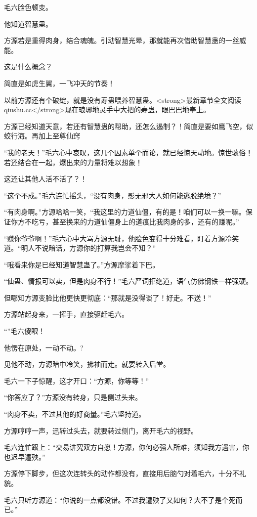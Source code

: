 \begin{this_body}
毛六脸色顿变。

他知道智慧蛊。

方源若是重得肉身，结合魂魄。引动智慧光晕，那就能再次借助智慧蛊的一丝威能。

这是什么概念？

简直是如虎生翼，一飞冲天的节奏！

以前方源还有个破绽，就是没有寿蛊喂养智慧蛊。<strong>最新章节全文阅读qiushu.cc</strong>现在琅琊地灵手中大把的寿蛊，眼巴巴地奉上。

方源已经知道天意，若还有智慧蛊的帮助，还怎么遏制？！简直是要如鹰飞空，似蛟行海。再加上至尊仙窍

“我的老天！”毛六心中哀叹，这几个因素单个而论，就已经惊天动地。惊世骇俗！若还结合在一起，爆出来的力量将难以想象！

这还让其他人活不活了？！

“这个不成。”毛六连忙摇头，“没有肉身，影无邪大人如何能逃脱绝境？”

“有肉身啊。”方源哈哈一笑，“我这里的力道仙僵，有的是！咱们可以一换一嘛。保证你方不吃亏，甚至换来的力道仙僵身上的道痕比我肉身的多，还有的赚呢。”

“赚你爷爷啊！”毛六心中大骂方源无耻，他脸色变得十分难看，盯着方源冷笑道。“明人不说暗话，方源你的打算我岂会不知？”

“哦看来你是已经知道智慧蛊了。”方源摩挲着下巴。

“仙蛊、情报可以卖，但是肉身不行！”毛六严词拒绝道，语气仿佛钢铁一样强硬。

但哪知方源变脸比他更快更彻底：“那就是没得谈了！好走。不送！”

方源站起身来，一挥手，直接驱赶毛六。

“”毛六傻眼！

他愣在原处，一动不动。?

见他不动，方源暗中冷笑，拂袖而走。就要转入后堂。

毛六一下子惊醒，这才开口：“方源，你等等！”

“你答应了？”方源没有转身，只是侧过头来。

“肉身不卖，不过其他的好商量。”毛六坚持道。

方源哼哼一声，迅转过头去，就要转过侧门，离开毛六的视野。

毛六连忙跟上：“交易讲究双方自愿！方源，你何必强人所难，须知我方遇害，你也迟早遭殃。”

方源停下脚步，但这次连转头的动作都没有，直接用后脑勺对着毛六，十分不礼貌。

毛六只听方源道：“你说的一点都没错。不过我遭殃了又如何？大不了是个死而已。”


\end{this_body}
